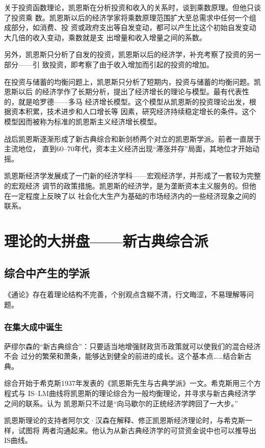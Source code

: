 关于投资函数理论，凯恩斯在分析投资和收入的关系时，谈到乘数原理。但他只谈了投资乘
数。凯恩斯以后的经济学家将乘数原理范围扩大至总需求中任何一个组成部分，如消费、投
资或政府支出等自发变动，都可以产生比这个初始自发变动大几倍的收入变动，乘数就是支
出增量和收入增量之间的系数。

另外，凯恩斯只分析了自发的投资，凯恩斯以后的经济学，补充考察了投资的另一部分——引
致投资，即考察了由于收入增加而引起的投资的增加。

在投资与储蓄的均衡问题上，凯恩斯只分析了短期内，投资与储蓄的均衡问题。凯恩斯以后
的经济学作了长期分析，提出了经济增长的理论与模型。最有代表性的，就是哈罗德——多马
经济增长模型。这个模型从凯恩斯的投资理论出发，根据资本积累，技术进步和人口增长等
因素，研究经济持续稳定增长的条件。这个模型因而被称为标准的凯恩斯主义经济增长模型。

战后凯恩斯逐渐形成了新古典综合和新剑桥两个对立的凯恩斯学派。前者一直居于主流地位，
直到60--70年代，资本主义经济出现“滞涨并存”局面，其地位才开始动摇。

凯恩斯经济学发展成了一门新的经济学科——宏观经济学，并形成了一套较为完整的宏观经济
调节的政策措施。凯恩斯的经济学，是为垄断资本主义服务的。但他在一定程度上反映了以
社会化大生产为基础的市场经济内的一些经济现象之间的联系。

\chapter{理论的大拼盘——新古典综合派}

\section{综合中产生的学派}

《通论》存在着理论结构不完善，个别观点含糊不清，行文晦涩，不易理解等问题。

\subsection{在集大成中诞生}

萨缪尔森的“新古典综合”：只要适当地增强财政货币政策就可以使我们的混合经济不会
过分的繁荣和萧条，能够达到健全的前进的成长。这个基本点……结合新古典。

综合开始于希克斯1937年发表的《凯恩斯先生与古典学派》一文。希克斯用三个方程式与
IS--LM曲线将凯恩斯的理论综合为一般均衡理论，并寻求与新古典经济学之间的联系。认为
凯恩斯只不过是“向马歇尔的正统经济学跨回了一大步。”

凯恩斯理论的支持者阿尔文·汉森在解释、修正凯恩斯经济理论时，与希克斯一样，试图将
两者沟通起来。他认为从新古典经济学的可贷资金说中也可以推导出IS曲线。

